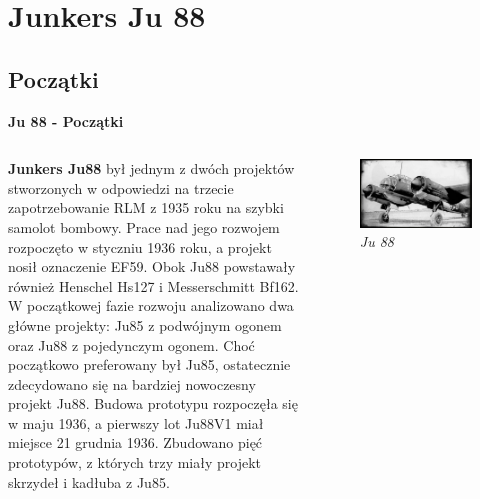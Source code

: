 \section{\large{\textbf{Junkers Ju 88}}}

\subsection{Początki}


\begin{frame}{\Huge{\textbf{Ju 88 - Początki}}}
	\begin{columns}[t]
			\justifying

\textbf{Junkers Ju88} był jednym z dwóch projektów stworzonych w odpowiedzi na trzecie zapotrzebowanie RLM z 1935 roku na szybki samolot bombowy. Prace nad jego rozwojem rozpoczęto w styczniu 1936 roku, a projekt nosił oznaczenie EF59. Obok Ju88 powstawały również Henschel Hs127 i Messerschmitt Bf162. \\
W początkowej fazie rozwoju analizowano dwa główne projekty: Ju85 z podwójnym ogonem oraz Ju88 z pojedynczym ogonem. Choć początkowo preferowany był Ju85, ostatecznie zdecydowano się na bardziej nowoczesny projekt Ju88. Budowa prototypu rozpoczęła się w maju 1936, a pierwszy lot Ju88V1 miał miejsce 21 grudnia 1936. Zbudowano pięć prototypów, z których trzy miały projekt skrzydeł i kadłuba z Ju85.

			\begin{figure}
				\centering
				\includegraphics[scale=0.25]{images/ju88-01.jpg}
				\caption{\textit{Ju 88}}
			\end{figure}
	\end{columns}
\end{frame}


